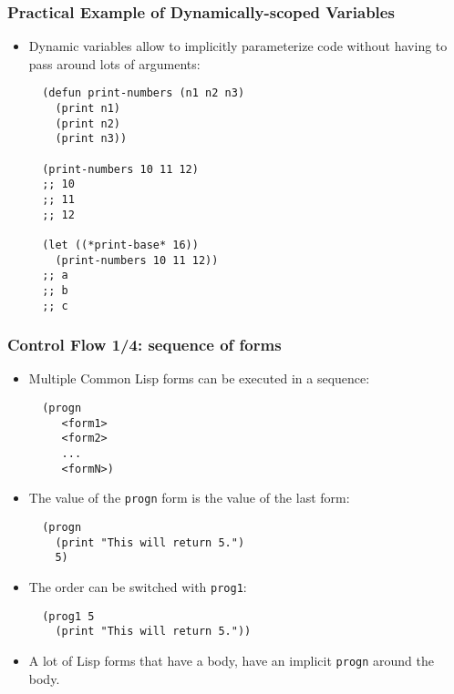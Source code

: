 \documentclass{beamer}
\begin{document}
\begin{frame}[fragile]
  \frametitle{Practical Example of Dynamically-scoped Variables}
  \begin{itemize}
  \item Dynamic variables allow to implicitly parameterize code without having
    to pass around lots of arguments:
\begin{verbatim}
  (defun print-numbers (n1 n2 n3)
    (print n1)
    (print n2)
    (print n3))

  (print-numbers 10 11 12)
  ;; 10
  ;; 11
  ;; 12

  (let ((*print-base* 16))
    (print-numbers 10 11 12))
  ;; a
  ;; b
  ;; c
\end{verbatim}
  \end{itemize}
\end{frame}

\begin{frame}[fragile]
  \frametitle{Control Flow 1/4: sequence of forms}
  \begin{itemize}
  \item Multiple Common Lisp forms can be executed in a sequence:
\begin{verbatim}
  (progn
     <form1>
     <form2>
     ...
     <formN>)
\end{verbatim}
  \item The value of the \texttt{progn} form is the value of the last
    form:
\begin{verbatim}
  (progn
    (print "This will return 5.")
    5)
\end{verbatim}
  \item The order can be switched with \texttt{prog1}:
\begin{verbatim}
  (prog1 5
    (print "This will return 5."))
\end{verbatim}
  \item A lot of Lisp forms that have a body, have an implicit
    \texttt{progn} around the body.
  \end{itemize}
\end{frame}
\end{document}
